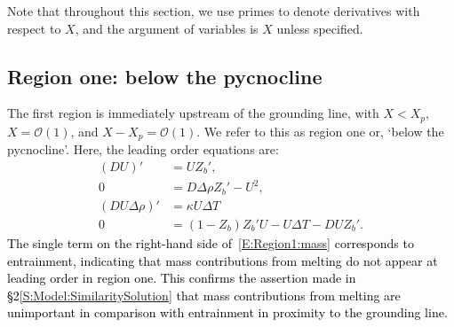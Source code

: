 \documentclass[openacc]{rsproca_new}%
\newcommand{\dd}[2]{\frac{\mathrm{d} #1}{\mathrm{d} #2}}
\newcommand{\order}[1]{\mathcal{O}(#1)}
\newcommand{\red}[1]{{\color{red} #1}}
\newcommand{\blue}[1]{{\color{blue} #1}}
\newcommand{\rout}[1]{\red{\st{#1}}}\newcommand{\ab}[1]{\textcolor{Green}{#1}}\newcommand{\about}[1]{\textcolor{Cyan}{\sout{#1}}}
\renewcommand{\rout}[1]{{}} %
\renewcommand{\blue}[1]{{\textcolor{black}{#1}}} %
\renewcommand{\red}[1]{{}} %
\begin{document}
Note that throughout this section, we use primes to denote derivatives with respect to $X$, and the argument of variables is $X$ unless specified.



\subsection{Region one: below the pycnocline}\label{S:Asymptotics:Region1}
The first region is immediately upstream of the grounding line,  with $X  <  X_p$,  $X= \order{1}$, and $X - X_p = \mathcal{O}(1)$. We refer to this as region one or, `below the pycnocline'. Here, the leading order equations are:
\begin{align}
(DU)' &= U Z_b',\label{E:Region1:mass}\\
0 &= D \Delta \rho Z_b' - U^2, \label{E:Region1:mom}\\
(DU\Delta \rho)'  &=\kappa U \Delta T\label{E:Region1:buoyancy}\\
0&= (1  - Z_b)Z_b' U- U\Delta T - DU Z_b'.\label{E:Region1:thermal}
\end{align}
\rout{Equation }\blue{The single term on the right-hand side of}~\eqref{E:Region1:mass} \blue{corresponds to entrainment, indicating that mass contributions from melting do not appear at leading order in region one. This confirms the assertion made in \S2\ref{S:Model:SimilaritySolution} that mass contributions from melting are unimportant in comparison with entrainment in proximity to the grounding line.}  \rout{demonstrates that contributions to mass conservation from melting are not important near the grounding line, as was suggested earlier in \S\ref{S:Model}. }
\end{document}
